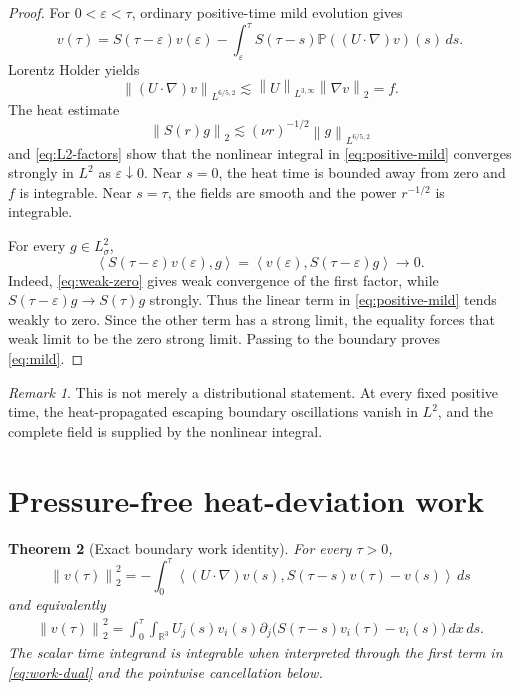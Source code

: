 \documentclass[11pt]{article}
\newtheorem{theorem}{Theorem}
\theoremstyle{remark}
\newtheorem{remark}[theorem]{Remark}
\newcommand{\R}{\mathbb R}
\newcommand{\Pp}{\mathbb P}
\newcommand{\norm}[1]{\left\|#1\right\|}
\newcommand{\ip}[2]{\left\langle #1,#2\right\rangle}
\begin{document}
\begin{proof}
For \(0<\varepsilon<\tau\), ordinary positive-time mild evolution gives
\begin{equation}
\label{eq:positive-mild}
 v(\tau)
 =
 S(\tau-\varepsilon)v(\varepsilon)
 -
 \int_\varepsilon^\tau
 S(\tau-s)\Pp((U\cdot\nabla)v)(s)\,ds.
\end{equation}
Lorentz Holder yields
\begin{equation}
\label{eq:source}
 \norm{(U\cdot\nabla)v}_{L^{6/5,2}}
 \lesssim
 \norm{U}_{L^{3,\infty}}\norm{\nabla v}_2
 =f.
\end{equation}
The heat estimate
\begin{equation}
\label{eq:heat-L2}
 \norm{S(r)g}_2
 \lesssim
 (\nu r)^{-1/2}\norm{g}_{L^{6/5,2}}
\end{equation}
and \eqref{eq:L2-factors} show that the nonlinear integral in
\eqref{eq:positive-mild} converges strongly in \(L^2\) as
\(\varepsilon\downarrow0\).  Near \(s=0\), the heat time is bounded
away from zero and \(f\) is integrable.  Near \(s=\tau\), the fields are
smooth and the power \(r^{-1/2}\) is integrable.

For every \(g\in L^2_\sigma\),
\[
 \ip{S(\tau-\varepsilon)v(\varepsilon)}{g}
 =
 \ip{v(\varepsilon)}{S(\tau-\varepsilon)g}
 \longrightarrow0.
\]
Indeed, \eqref{eq:weak-zero} gives weak convergence of the first factor,
while \(S(\tau-\varepsilon)g\to S(\tau)g\) strongly.  Thus the linear
term in \eqref{eq:positive-mild} tends weakly to zero.  Since the other
term has a strong limit, the equality forces that weak limit to be the
zero strong limit.  Passing to the boundary proves \eqref{eq:mild}.
\end{proof}

\begin{remark}
This is not merely a distributional statement.  At every fixed positive
time, the heat-propagated escaping boundary oscillations vanish in
\(L^2\), and the complete field is supplied by the nonlinear integral.
\end{remark}

\section{Pressure-free heat-deviation work}

\begin{theorem}[Exact boundary work identity]
\label{thm:work}
For every \(\tau>0\),
\begin{equation}
\label{eq:work-dual}
 \boxed{
 \norm{v(\tau)}_2^2
 =
 -\int_0^\tau
 \ip{(U\cdot\nabla)v(s)}
 {S(\tau-s)v(\tau)-v(s)}\,ds
 }
\end{equation}
and equivalently
\begin{equation}
\label{eq:work-tensor}
 \boxed{
 \begin{aligned}
 \norm{v(\tau)}_2^2
 =
 \int_0^\tau\int_{\R^3}
 U_j(s)v_i(s)
 \partial_j\bigl(
 S(\tau-s)v_i(\tau)-v_i(s)
 \bigr)\,dx\,ds.
 \end{aligned}
 }
\end{equation}
The scalar time integrand is integrable when interpreted through the
first term in \eqref{eq:work-dual} and the pointwise cancellation below.
\end{theorem}
\end{document}
